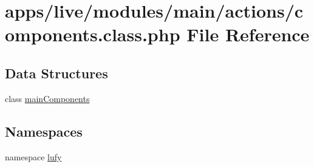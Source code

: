 \hypertarget{live_2modules_2main_2actions_2components_8class_8php}{\section{apps/live/modules/main/actions/components.class.\-php File Reference}
\label{live_2modules_2main_2actions_2components_8class_8php}
}
\subsection*{Data Structures}
\begin{DoxyCompactItemize}
\item 
class \hyperlink{classmain_components}{main\-Components}
\end{DoxyCompactItemize}
\subsection*{Namespaces}
\begin{DoxyCompactItemize}
\item 
namespace \hyperlink{namespacelufy}{lufy}
\end{DoxyCompactItemize}
